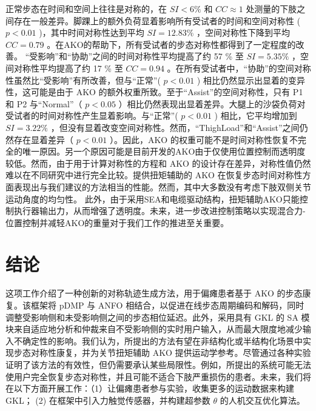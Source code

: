 正常步态在时间和空间上往往是对称的，在    ${SI < 6 \%  }$    和    ${CC} \approx {1}$       \cite{balabanGaitDisturbancesPatients2014}    处测量的下肢之间存在一般差异。脚踝上的额外负荷显着影响所有受试者的时间和空间对称性 (    $p<0.01$    )，其中时间对称性达到平均    ${SI} = 12.83 \%  $    ，空间对称性下降到平均    ${CC} = 0.79$    。在AKO的帮助下，所有受试者的步态对称性都得到了一定程度的改善。
“受影响”和“协助”之间的时间对称性平均提高了约 57 \% 至    ${SI} = 5.35 \%  $   ，空间对称性平均提高了约 17 \% 至    ${CC} = 0.94$   。在所有受试者中，“协助”的空间对称性虽然比“受影响”有所改善，但与“正常”(    $p<0.01$    ) 相比仍然显示出显着的变异性，这可能是由于 AKO 的额外权重所致。至于“Assist”的空间对称性，只有 P1 和 P2 与“Normal”（   $p<0.05$   ）相比仍然表现出显着差异。大腿上的沙袋负荷对受试者的时间对称性产生显着影响。与“正常”(    $p<0.01$    ) 相比，它平均增加到    ${SI} = 3.22 \%  $   ，但没有显着改变空间对称性。然而，“ThighLoad”和“Assist”之间仍然存在显着差异（   $p<0.01$   ）。因此，AKO 的权重可能不是时间对称性恢复不完全的唯一原因。另一个原因可能是目前开发的AKO由于仅使用位置控制而透明度较低。然而，由于用于计算对称性的方程和 AKO 的设计存在差异，对称性值仍然难以在不同研究中进行完全比较。提供扭矩辅助的 AKO 在恢复步态时间对称性方面表现出与我们建议的方法相当的性能。然而，其中大多数没有考虑下肢双侧关节运动角度的均匀性。
 此外，由于采用SEA和电缆驱动结构，扭矩辅助AKO只能控制执行器输出力，从而增强了透明度。未来，进一步改进控制策略以实现混合力-位置控制并减轻AKO的重量对于我们工作的推进至关重要。
   \section{结论  }    这项工作介绍了一种创新的对称轨迹生成方法，用于偏瘫患者基于 AKO 的步态康复。该框架将 pDMP 与 ANFO 相结合，以促进在线步态周期编码和解码，同时调整受影响侧和未受影响侧之间的步态相位延迟。此外，采用具有 GKL 的 SA 模块来自适应地分析和仲裁来自不受影响侧的实时用户输入，从而最大限度地减少输入不确定性的影响。我们认为，所提出的方法有望在非结构化或半结构化场景中实现步态对称性康复，并为关节扭矩辅助 AKO 提供运动学参考。尽管通过各种实验证明了该方法的有效性，但仍需要承认某些局限性。例如，所提出的系统可能无法使用户完全恢复步态对称性，并且可能不适合下肢严重损伤的患者。未来，我们将在以下方面开展工作：（1）让偏瘫患者参与实验，收集更多的运动数据来构建GKL； (2) 在框架中引入力触觉传感器，并构建超参数    $\theta $    的人机交互优化算法。  
